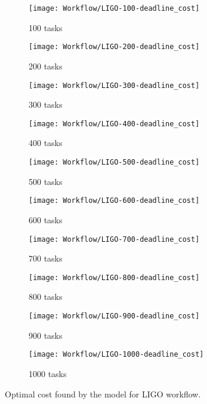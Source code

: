 {     \begin{figure}[tb] 
       \centering       
       \begin{subfigure}[b]{0.45\textwidth}
         \texttt{[image: Workflow/LIGO-100-deadline\_cost]}
         \caption{100 tasks}
       \end{subfigure}
       \begin{subfigure}[b]{0.45\textwidth}
         \texttt{[image: Workflow/LIGO-200-deadline\_cost]}
         \caption{200 tasks}
       \end{subfigure}
       \begin{subfigure}[b]{0.45\textwidth}
         \texttt{[image: Workflow/LIGO-300-deadline\_cost]}
         \caption{300 tasks}
       \end{subfigure}
       \begin{subfigure}[b]{0.45\textwidth}
         \texttt{[image: Workflow/LIGO-400-deadline\_cost]}
         \caption{400 tasks}
       \end{subfigure}
       \begin{subfigure}[b]{0.45\textwidth}
         \texttt{[image: Workflow/LIGO-500-deadline\_cost]}
         \caption{500 tasks}
       \end{subfigure}
       \begin{subfigure}[b]{0.45\textwidth}
         \texttt{[image: Workflow/LIGO-600-deadline\_cost]}
         \caption{600 tasks}
       \end{subfigure}
       \begin{subfigure}[b]{0.45\textwidth}
         \texttt{[image: Workflow/LIGO-700-deadline\_cost]}
         \caption{700 tasks}
       \end{subfigure}
       \begin{subfigure}[b]{0.45\textwidth}
         \texttt{[image: Workflow/LIGO-800-deadline\_cost]}
         \caption{800 tasks}
       \end{subfigure}
       \begin{subfigure}[b]{0.45\textwidth}
         \texttt{[image: Workflow/LIGO-900-deadline\_cost]}
         \caption{900 tasks}
       \end{subfigure}
       \begin{subfigure}[b]{0.45\textwidth}
         \texttt{[image: Workflow/LIGO-1000-deadline\_cost]}
         \caption{1000 tasks}
       \end{subfigure}
       \caption{Optimal cost found by the model for LIGO workflow.}
       \label{fig:workflow:ligo}
     \end{figure}
     
}
